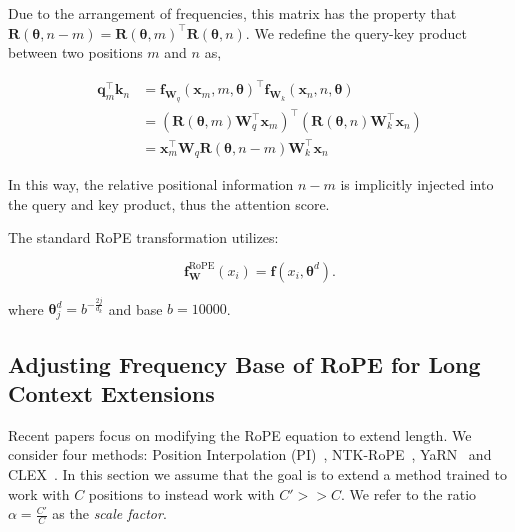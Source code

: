 \documentclass{article}
\begin{document}
Due to the arrangement of frequencies, this matrix has the property that $\mathbf{R}(\bm{\theta},n - m) = \mathbf{R}(\bm{\theta},m)^\top\mathbf{R}(\bm{\theta},n)$. We redefine the query-key product between two positions $m$ and $n$ as, 

\begin{align}
\mathbf{q}^\top_m{\mathbf{k}_n}&=\mathbf{f}_{\mathbf{W}_q}(\mathbf{x}_m, m, \bm{\theta})^\top\mathbf{f}_{\mathbf{W}_k}(\mathbf{x}_n, n, \bm{\theta}) \\ 
& = \left(\mathbf{R}({\bm{\theta},m})\mathbf{W}^\top_q\mathbf{x}_m \right)^\top \left( \mathbf{R}(\bm{\theta},n)\mathbf{W}^\top_k\mathbf{x}_n \right) \\
&= \mathbf{x}_m^\top\mathbf{W}_q \mathbf{R}(\bm{\theta},n - m) \mathbf{W}_k^\top\mathbf{x}_n 
\end{align}

In this way, the relative positional information $n-m$
is implicitly injected into the query and key product, thus the attention score.

The standard RoPE transformation utilizes: 

\begin{equation}
\mathbf{f}_\mathbf{W}^{\text{RoPE}}(x_i) = \mathbf{f}(x_i, \bm{\theta}^d).
\end{equation}

where $\bm{\theta}^d_j = b^{-\frac{2j}{d_k}}$ and base $b=10000$. 






\subsection{Adjusting Frequency Base of RoPE for Long Context Extensions}

Recent papers focus on modifying the RoPE equation to extend length. We consider four methods: Position Interpolation (PI)~\citep{chen2023extending}, NTK-RoPE~\citep{emozillareddit}, YaRN~\citep{peng2023yarn} and CLEX~\citep{chen2024clexcontinuouslengthextrapolation}. In this section we assume that the goal is to extend a method trained to work with $C$ positions to instead work with $C' >> C$. We refer to the ratio $\alpha = \frac{C'}{C}$ as the \textit{scale factor}.
\end{document}
